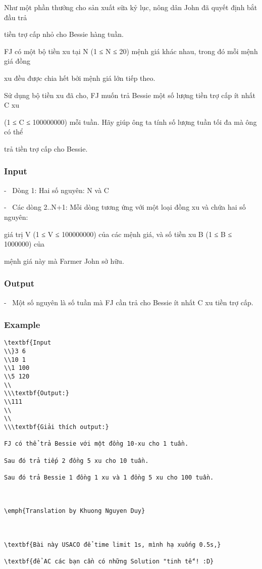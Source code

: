 



   Như một phần thưởng cho sản xuất sữa kỷ lục, nông dân John đã quyết định bắt đầu trả  

   tiền trợ cấp nhỏ cho Bessie hàng tuần.  

   FJ có một bộ tiền xu tại N (1 ≤ N ≤ 20) mệnh giá khác nhau, trong đó mỗi mệnh giá đồng  

   xu đều được chia hết bởi mệnh giá lớn tiếp theo.  

   Sử dụng bộ tiền xu đã cho, FJ muốn trả Bessie một số lượng tiền trợ cấp ít nhất C xu  

   (1 ≤ C ≤ 100000000) mỗi tuần. Hãy giúp ông ta tính số lượng tuần tối đa mà ông có thể  

   trả tiền trợ cấp cho Bessie.  

\subsubsection{   Input  }

   -  Dòng 1: Hai số nguyên: N và C  

   -  Các dòng 2..N+1: Mỗi dòng tương ứng với một loại đồng xu và chứa hai số nguyên:  

   giá trị V (1 ≤ V ≤ 100000000) của các mệnh giá, và số tiền xu B (1 ≤ B ≤ 1000000) của  

   mệnh giá này mà Farmer John sở hữu.  

\subsubsection{   Output  }

   -  Một số nguyên là số tuần mà FJ cần trả cho Bessie ít nhất C xu tiền trợ cấp.  

\subsubsection{   Example  }
\begin{verbatim}
\textbf{Input
\\}3 6
\\10 1
\\1 100
\\5 120
\\
\\\textbf{Output:}
\\111
\\
\\
\\\textbf{Giải thích output:}

FJ có thể trả Bessie với một đồng 10-xu cho 1 tuần.

Sau đó trả tiếp 2 đồng 5 xu cho 10 tuần.

Sau đó trả Bessie 1 đồng 1 xu và 1 đồng 5 xu cho 100 tuần.

 

\emph{Translation by Khuong Nguyen Duy}

 

\textbf{Bài này USACO để time limit 1s, mình hạ xuống 0.5s,}

\textbf{để AC các bạn cần có những Solution "tinh tế"! :D}\end{verbatim}